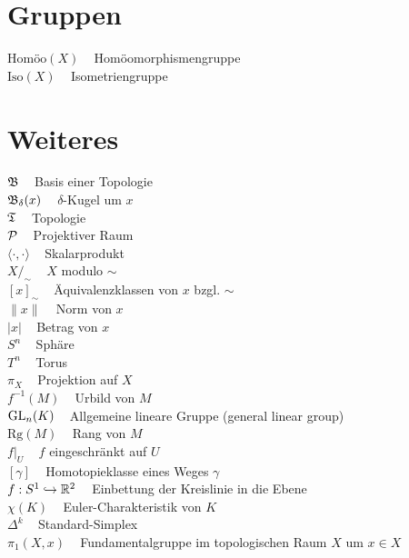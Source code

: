 \begin{minipage}[t]{0.45\textwidth}

\section*{Gruppen}
$\text{Homöo}(X)\;\;\;$ Homöomorphismengruppe\\
$\text{Iso}(X)\;\;\;$ Isometriengruppe\\

\section*{Weiteres}
$\mathfrak{B}\;\;\;$ Basis einer Topologie\\
$\mathfrak{B}_\delta(x)\;\;\;$ $\delta$-Kugel um $x$\\
$\mathfrak{T}\;\;\;$ Topologie\\

$\mathcal{P}\;\;\;$ Projektiver Raum\\
$\langle \cdot , \cdot \rangle\;\;\;$ Skalarprodukt\\
$X /_\sim\;\;\;$ $X$ modulo $\sim$\\
$[x]_\sim\;\;\;$ Äquivalenzklassen von $x$ bzgl. $\sim$\\
$\| x \|\;\;\;$ Norm von $x$\\
$| x |\;\;\;$ Betrag von $x$\\

$S^n\;\;\;$ Sphäre\\
$T^n\;\;\;$ Torus\\

$\pi_X\;\;\;$ Projektion auf $X$\\
$f^{-1}(M)\;\;\;$ Urbild von $M$\\
$\mathrm{GL}_n(K)\;\;\;$ Allgemeine lineare Gruppe (general linear group)\\
$\text{Rg}(M)\;\;\;$ Rang von $M$\\
$f|_U\;\;\;$ $f$ eingeschränkt auf $U$\\
$[\gamma]\;\;\;$ Homotopieklasse eines Weges $\gamma$\\
$f:S^1 \hookrightarrow \mathbb{R}^2\;\;\;$ Einbettung der Kreislinie in die Ebene\\
$\chi(K)\;\;\;$ Euler-Charakteristik von $K$\\
$\Delta^k\;\;\;$ Standard-Simplex\\
$\pi_1(X,x)\;\;\;$ Fundamentalgruppe im topologischen Raum $X$ um $x \in X$


\end{minipage}
